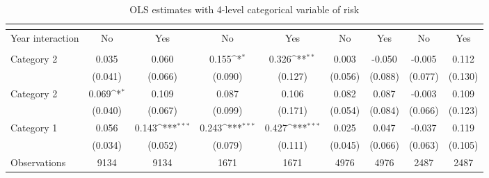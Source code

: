 {
\def\sym#1{\ifmmode^{#1}\else\(^{#1}\)\fi}
\begin{longtable}{l*{8}{c}}
	\caption{OLS estimates with 4-level categorical variable of risk\label{table:8-robust-2}}	\\
\toprule
                &&&&\\
                \midrule 
                Year interaction & No & Yes & No & Yes & No & Yes & No & Yes \\
\midrule
\addlinespace
{} \\
\addlinespace
Category 2&    0.035         &    0.060         &    0.155\sym{*}  &    0.326\sym{**} &    0.003         &   -0.050         &   -0.005         &    0.112         \\
                &  (0.041)         &  (0.066)         &  (0.090)         &  (0.127)         &  (0.056)         &  (0.088)         &  (0.077)         &  (0.130)         \\
\addlinespace
Category 2&    0.069\sym{*}  &    0.109         &    0.087         &    0.106         &    0.082         &    0.087         &   -0.003         &    0.109         \\
                &  (0.040)         &  (0.067)         &  (0.099)         &  (0.171)         &  (0.054)         &  (0.084)         &  (0.066)         &  (0.123)         \\
\addlinespace
Category 1&    0.056         &    0.143\sym{***}&    0.243\sym{***}&    0.427\sym{***}&    0.025         &    0.047         &   -0.037         &    0.119         \\
                &  (0.034)         &  (0.052)         &  (0.079)         &  (0.111)         &  (0.045)         &  (0.066)         &  (0.063)         &  (0.105)         \\

\midrule
Observations    &     9134         &     9134         &     1671         &     1671         &     4976         &     4976         &     2487         &     2487         \\




\end{longtable}}
